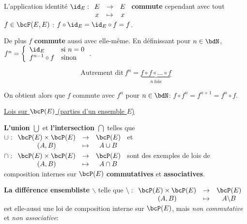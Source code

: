 \documentclass[a4paper,french,bookmarks]{article}
\begin{document}
\begin{enumerate}
\begin{enumerate}
        \itstar L'application identité $\id_E: \begin{array}[t]{ccc}
        E &\to& E \\
        x &\mapsto& x
    \end{array}$ \textbf{commute} cependant avec tout $f \in \bcF(E, E)$ : $f \circ \id_E = \id_E \circ f = f$.
    
    De plus $f$ \textbf{commute} aussi avec elle-même. En définissant pour $n \in \bdN$, $f^n = \left\lbrace\begin{array}{ll}
        \id_E &\text{si} \ n = 0  \\
        f^{n-1} \circ f &\text{sinon} 
    \end{array}\right.$.
    
    \[ \text{Autrement dit} \ f^n = \underbrace{f \circ f \circ \dots \circ f}_{n \ \text{fois}}\]
    
    On obtient alors que $f$ commute avec $f^n$ pour $n \in \bdN$: $f \circ f^n = f^{n+1} = f^n \circ f$.
    
    \end{enumerate}
    
    \ithand \underline{Lois sur $\bcP(E)$ (parties d'un ensemble $E$)}
    
    \begin{enumerate}
    
        \itstar  \textbf{L'union $\bigcup$} et \textbf{l'intersection  $\bigcap$} telles que $\cup: \begin{array}[t]{ccc}
            \bcP(E)\times \bcP(E) &\to& \bcP(E)  \\
            (A,B) &\mapsto& A\cup B 
        \end{array}$ et $\cap: \begin{array}[t]{ccc}
            \bcP(E)\times \bcP(E) &\to& \bcP(E)  \\
            (A,B) &\mapsto& A\cap B
        \end{array}$ sont des exemples de lois de composition internes sur $\bcP(E)$ \textbf{commutatives} et \textbf{associatives}.
        
        \itstar  \textbf{La différence ensembliste $\backslash$} telle que $\backslash : \begin{array}[t]{ccc}
            \bcP(E) \times \bcP(E) &\to& \bcP(E) \\
            (A, B) &\mapsto& A \backslash B 
        \end{array}$ est elle-aussi une loi de composition interne sur $\bcP(E)$, mais \textit{non commutative} et \textit{non associative}:
        

\end{enumerate}
\end{enumerate}
\end{document}
